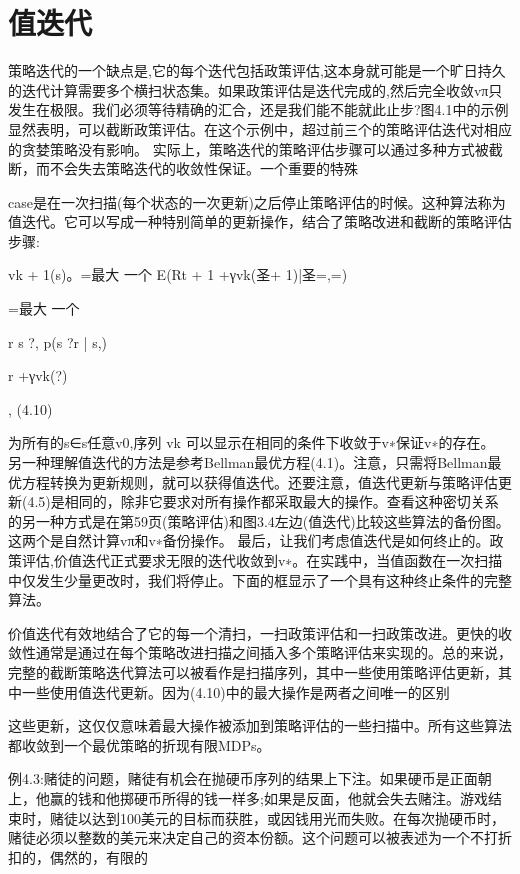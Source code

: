 \section{值迭代}

策略迭代的一个缺点是,它的每个迭代包括政策评估,这本身就可能是一个旷日持久的迭代计算需要多个横扫状态集。如果政策评估是迭代完成的,然后完全收敛vπ只发生在极限。我们必须等待精确的汇合，还是我们能不能就此止步?图4.1中的示例显然表明，可以截断政策评估。在这个示例中，超过前三个的策略评估迭代对相应的贪婪策略没有影响。
实际上，策略迭代的策略评估步骤可以通过多种方式被截断，而不会失去策略迭代的收敛性保证。一个重要的特殊

case是在一次扫描(每个状态的一次更新)之后停止策略评估的时候。这种算法称为值迭代。它可以写成一种特别简单的更新操作，结合了策略改进和截断的策略评估步骤:

vk + 1(s)。=最大
一个
E(Rt + 1 +γvk(圣+ 1)|圣=,=)

=最大
一个

r s ?,
p(s ?r | s,)

r +γvk(?)

, 					(4.10)


为所有的s∈s任意v0,序列{ vk }可以显示在相同的条件下收敛于v∗保证v∗的存在。
另一种理解值迭代的方法是参考Bellman最优方程(4.1)。注意，只需将Bellman最优方程转换为更新规则，就可以获得值迭代。还要注意，值迭代更新与策略评估更新(4.5)是相同的，除非它要求对所有操作都采取最大的操作。查看这种密切关系的另一种方式是在第59页(策略评估)和图3.4左边(值迭代)比较这些算法的备份图。这两个是自然计算vπ和v∗备份操作。
最后，让我们考虑值迭代是如何终止的。政策评估,价值迭代正式要求无限的迭代收敛到v∗。在实践中，当值函数在一次扫描中仅发生少量更改时，我们将停止。下面的框显示了一个具有这种终止条件的完整算法。
 

价值迭代有效地结合了它的每一个清扫，一扫政策评估和一扫政策改进。更快的收敛性通常是通过在每个策略改进扫描之间插入多个策略评估来实现的。总的来说，完整的截断策略迭代算法可以被看作是扫描序列，其中一些使用策略评估更新，其中一些使用值迭代更新。因为(4.10)中的最大操作是两者之间唯一的区别

这些更新，这仅仅意味着最大操作被添加到策略评估的一些扫描中。所有这些算法都收敛到一个最优策略的折现有限MDPs。

例4.3:赌徒的问题，赌徒有机会在抛硬币序列的结果上下注。如果硬币是正面朝上，他赢的钱和他掷硬币所得的钱一样多;如果是反面，他就会失去赌注。游戏结束时，赌徒以达到100美元的目标而获胜，或因钱用光而失败。在每次抛硬币时，赌徒必须以整数的美元来决定自己的资本份额。这个问题可以被表述为一个不打折扣的，偶然的，有限的

